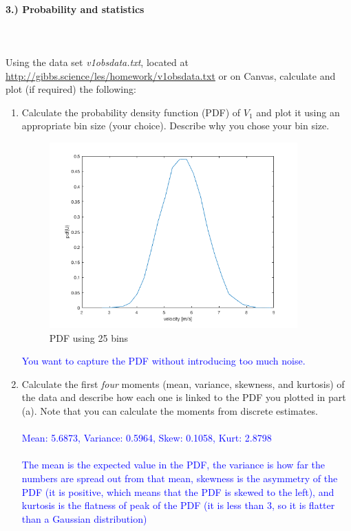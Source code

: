 \documentclass[11pt]{article}
\begin{document}
\paragraph{3.) Probability and statistics}~\\\\
Using the data set \textit{v1obsdata.txt}, located at \href{http://gibbs.science/les/homework/v1obsdata.txt}{http://gibbs.science/les/homework/v1obsdata.txt} or on Canvas, calculate and plot (if required) the following:
\begin{enumerate}[label=(\alph*),topsep=-10pt]
	\item Calculate the probability density function (PDF) of $V_1$ and plot it using an appropriate bin size (your choice). Describe why you chose your bin size.
	\begin{figure}[H]
	\centering
	\includegraphics[width=0.9\textwidth]{pdf_25}
	\caption{PDF using 25 bins}
	\end{figure}
	\textcolor{blue}{You want to capture the PDF without introducing too much noise.}
	\item Calculate the first \textit{four} moments (mean, variance, skewness, and kurtosis) of the data and describe how each one is linked to the PDF you plotted in part (a). Note that you can calculate the moments from discrete estimates.\\\\
	\textcolor{blue}{Mean: 5.6873, Variance: 0.5964, Skew: 0.1058, Kurt: 2.8798\\\\
	The mean is the expected value in the PDF, the variance is how far the numbers are spread out from that mean, skewness is the asymmetry of the PDF (it is positive, which means that the PDF is skewed to the left), and kurtosis is the flatness of peak of the PDF (it is less than 3, so it is flatter than a Gaussian distribution)}

\end{enumerate}
\end{document}
